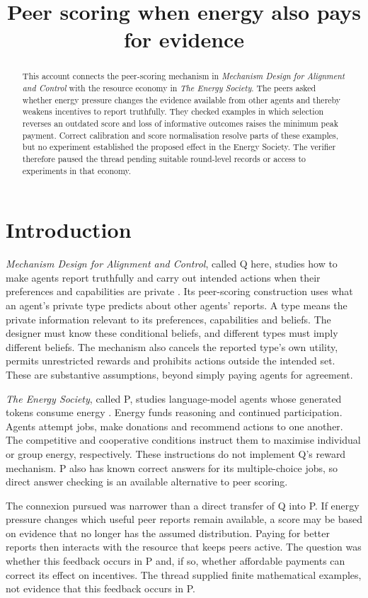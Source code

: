 \documentclass{article}
\title{Peer scoring when energy also pays for evidence}
\author{}
\date{}
\begin{document}
\maketitle
\begin{abstract}
This account connects the peer-scoring mechanism in \emph{Mechanism Design for Alignment and Control} with the
resource economy in \emph{The Energy Society}.
The peers asked whether energy pressure changes the evidence available from other agents and thereby weakens
incentives to report truthfully.
They checked examples in which selection reverses an outdated score and loss of informative outcomes raises the minimum peak payment.
Correct calibration and score normalisation resolve parts of these examples, but no experiment established the
proposed effect in the Energy Society.
The verifier therefore paused the thread pending suitable round-level records or access to experiments in that economy.
\end{abstract}

\section{Introduction}
\emph{Mechanism Design for Alignment and Control}, called Q here, studies how to make agents report truthfully
and carry out intended actions when their preferences and capabilities are private \cite{Q}.
Its peer-scoring construction uses what an agent's private type predicts about other agents' reports.
A type means the private information relevant to its preferences, capabilities and beliefs.
The designer must know these conditional beliefs, and different types must imply different beliefs.
The mechanism also cancels the reported type's own utility, permits unrestricted rewards and prohibits actions outside the intended set.
These are substantive assumptions, beyond simply paying agents for agreement.

\emph{The Energy Society}, called P, studies language-model agents whose generated tokens consume energy \cite{P}.
Energy funds reasoning and continued participation.
Agents attempt jobs, make donations and recommend actions to one another.
The competitive and cooperative conditions instruct them to maximise individual or group energy, respectively.
These instructions do not implement Q's reward mechanism.
P also has known correct answers for its multiple-choice jobs, so direct answer checking is an available alternative to peer scoring.

The connexion pursued was narrower than a direct transfer of Q into P.
If energy pressure changes which useful peer reports remain available, a score may be based on evidence that
no longer has the assumed distribution.
Paying for better reports then interacts with the resource that keeps peers active.
The question was whether this feedback occurs in P and, if so, whether affordable payments can correct its effect on incentives.
The thread supplied finite mathematical examples, not evidence that this feedback occurs in P.
\end{document}
